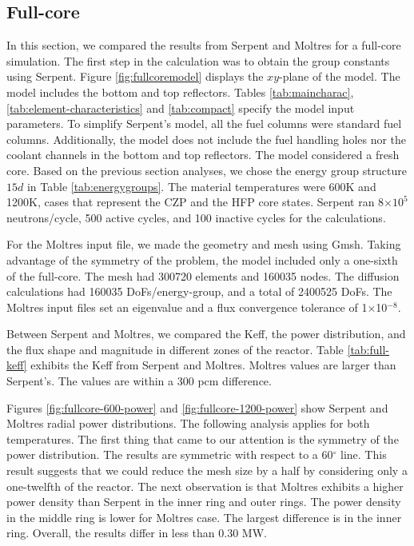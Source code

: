 \documentclass[11pt,letterpaper]{article}
\begin{document}
\subsection{Full-core}

In this section, we compared the results from Serpent and Moltres for a full-core simulation.
The first step in the calculation was to obtain the group constants using Serpent.
Figure \ref{fig:fullcoremodel} displays the $xy$-plane of the model.
The model includes the bottom and top reflectors.
Tables \ref{tab:maincharac}, \ref{tab:element-characteristics} and \ref{tab:compact} specify the model input parameters.
To simplify Serpent's model, all the fuel columns were standard fuel columns.
Additionally, the model does not include the fuel handling holes nor the coolant channels in the bottom and top reflectors.
The model considered a fresh core.
Based on the previous section analyses, we chose the energy group structure $15d$ in Table \ref{tab:energygroups}.
The material temperatures were 600K and 1200K, cases that represent the \gls{CZP} and the \gls{HFP} core states.
Serpent ran 8$\times 10^5$ neutrons/cycle, 500 active cycles, and 100 inactive cycles for the calculations.

For the Moltres input file, we made the geometry and mesh using Gmsh.
Taking advantage of the symmetry of the problem, the model included only a one-sixth of the full-core.
The mesh had 300720 elements and 160035 nodes.
The diffusion calculations had 160035 \glspl{DoF}/energy-group, and a total of 2400525 DoFs.
The Moltres input files set an eigenvalue and a flux convergence tolerance of 1$\times$10$^{-8}$.

Between Serpent and Moltres, we compared the \gls{Keff}, the power distribution, and the flux shape and magnitude in different zones of the reactor.
Table \ref{tab:full-keff} exhibits the \gls{Keff} from Serpent and Moltres.
Moltres values are larger than Serpent's.
The values are within a 300 pcm difference.

Figures \ref{fig:fullcore-600-power} and \ref{fig:fullcore-1200-power} show Serpent and Moltres radial power distributions.
The following analysis applies for both temperatures.
The first thing that came to our attention is the symmetry of the power distribution.
The results are symmetric with respect to a 60$^{\circ}$ line.
This result suggests that we could reduce the mesh size by a half by considering only a one-twelfth of the reactor.
The next observation is that Moltres exhibits a higher power density than Serpent in the inner ring and outer rings.
The power density in the middle ring is lower for Moltres case.
The largest difference is in the inner ring.
Overall, the results differ in less than 0.30 MW.
\end{document}
